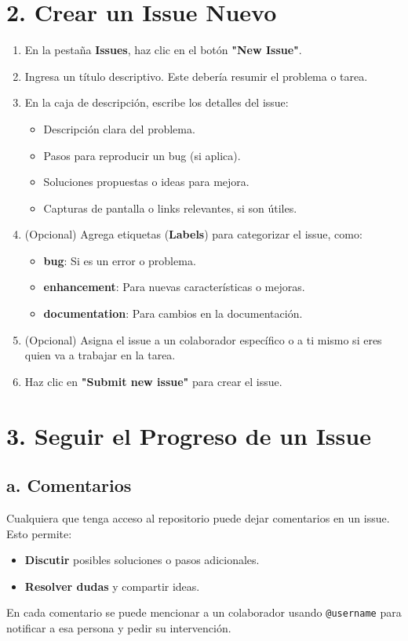 \documentclass{article}
\begin{document}
\section{2. Crear un Issue Nuevo}
\begin{enumerate}
    \item En la pestaña \textbf{Issues}, haz clic en el botón \textbf{"New Issue"}.
    \item Ingresa un título descriptivo. Este debería resumir el problema o tarea.
    \item En la caja de descripción, escribe los detalles del issue:
    \begin{itemize}
        \item Descripción clara del problema.
        \item Pasos para reproducir un bug (si aplica).
        \item Soluciones propuestas o ideas para mejora.
        \item Capturas de pantalla o links relevantes, si son útiles.
    \end{itemize}
    \item (Opcional) Agrega etiquetas (\textbf{Labels}) para categorizar el issue, como:
    \begin{itemize}
        \item \textbf{bug}: Si es un error o problema.
        \item \textbf{enhancement}: Para nuevas características o mejoras.
        \item \textbf{documentation}: Para cambios en la documentación.
    \end{itemize}
    \item (Opcional) Asigna el issue a un colaborador específico o a ti mismo si eres quien va a trabajar en la tarea.
    \item Haz clic en \textbf{"Submit new issue"} para crear el issue.
\end{enumerate}

\section{3. Seguir el Progreso de un Issue}
\subsection{a. Comentarios}
Cualquiera que tenga acceso al repositorio puede dejar comentarios en un issue. Esto permite:
\begin{itemize}
    \item \textbf{Discutir} posibles soluciones o pasos adicionales.
    \item \textbf{Resolver dudas} y compartir ideas.
\end{itemize}
En cada comentario se puede mencionar a un colaborador usando \texttt{@username} para notificar a esa persona y pedir su intervención.
\end{document}
